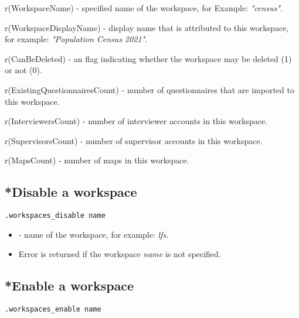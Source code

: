 \savedres
\begin{compactitem}
    \item r(WorkspaceName) - specified name of the workspace, for Example:
          \textit{"census"}.
    \item r(WorkspaceDisplayName) - display name that is attributed to this
          workspace, for example: \textit{"Population Census 2021"}.
    \item r(CanBeDeleted) - an flag indicating whether the workspace may be
          deleted (1) or not (0).
    \item r(ExistingQuestionnairesCount) - number of questionnaires that are
          imported to this workspace.
    \item r(InterviewersCount) - number of interviewer accounts in this
          workspace.
    \item r(SupervisorsCount) - number of supervisor accounts in this workspace.
    \item r(MapsCount) - number of maps in this workspace.
\end{compactitem}


\subsection{*Disable a workspace}

\begin{lstlisting}[style=CommandLineStyle]
.workspaces_disable name
\end{lstlisting}

\paramsheader
\begin{itemize}
\item {} - name of the workspace, for example: \textit{lfs}.
\end{itemize}

\errheader
\begin{itemize}
\item Error  is returned if the workspace \textit{name} is not specified.
\end{itemize}

\subsection{*Enable a workspace}

\begin{lstlisting}[style=CommandLineStyle]
.workspaces_enable name
\end{lstlisting}

